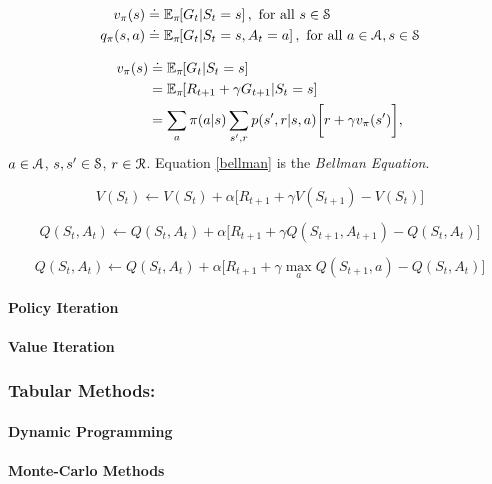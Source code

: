 \documentclass[a4paper, twoside, 12pt]{article}
\begin{document}
\begin{align}
    \vpi(s) &\defeq \EE{\pi}{G_t|S_t=s}, \text{ for all } s\in\S \\
    \qpi(s,a) &\defeq \EE{\pi}{G_t|S_t=s, A_t=a}, \text{ for all } a\in\A, s\in\S
\end{align}

\begin{equation} \label{bellman}
\begin{split}
    \vpi(s) &\defeq \EE{\pi}{G_t|S_t=s} \\
    &= \EE{\pi}{R_{t+1}+\gamma G_{t+1}|S_t=s} \\
    &= \sum_{a}{\pi(a|s)}\sum_{s',r}{p(s',r|s,a)}\bigg[r+\gamma\vpi(s')\bigg],
\end{split}
\end{equation}
\(a\in\A\), \(s,s'\in\S\), \(r\in\R\). Equation \ref{bellman} is the \emph{Bellman Equation}.


\begin{equation}
    V(S_t) \leftarrow V(S_t) + \alpha\big[R_{t+1}+\gamma V(S_{t+1}) - V(S_t)\big]
\end{equation}

\begin{equation}
    Q(S_t, A_t) \leftarrow Q(S_t,A_t) + \alpha\big[R_{t+1}+\gamma Q(S_{t+1},A_{t+1}) - Q(S_t, A_t)\big]
\end{equation}

\begin{equation}
    Q(S_t, A_t) \leftarrow Q(S_t,A_t) + \alpha\big[R_{t+1}+\gamma\max_a Q(S_{t+1},a) - Q(S_t, A_t)\big]
\end{equation}


\paragraph{Policy Iteration}
\label{sec:org590e8c9}
\paragraph{Value Iteration}
\label{sec:org92f5770}
\subsubsection{Tabular Methods:}
\label{sec:org60c7098}
\paragraph{Dynamic Programming}
\label{sec:org191668b}
\paragraph{Monte-Carlo Methods}
\label{sec:org586cd50}
\end{document}
